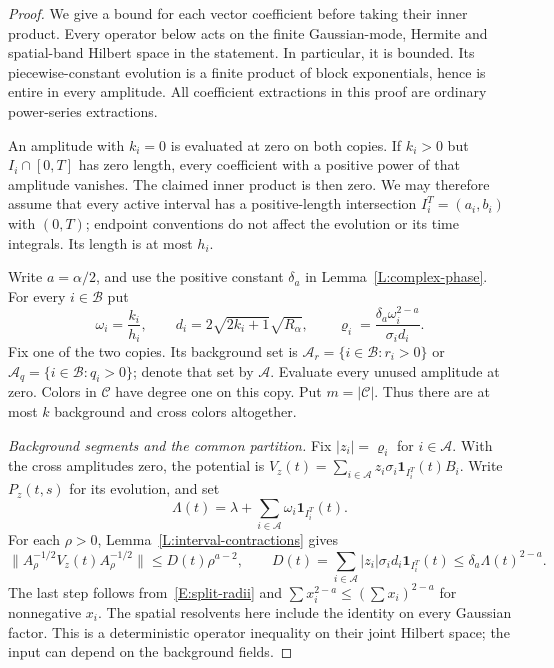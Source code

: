 \documentclass[12pt]{article}
\numberwithin{equation}{section}
\theoremstyle{definition}
\begin{document}
\begin{proof}
  We give a bound for each vector coefficient before taking their inner
  product. Every operator below acts on the finite Gaussian-mode, Hermite
  and spatial-band Hilbert space in the statement. In particular, it is
  bounded. Its piecewise-constant evolution is a finite product of block
  exponentials, hence is entire in every amplitude. All coefficient
  extractions in this proof are ordinary power-series extractions.

  An amplitude with $k_i=0$ is evaluated at zero on both copies. If
  $k_i>0$ but $I_i\cap[0,T]$ has zero length, every coefficient with a
  positive power of that amplitude vanishes. The claimed inner product
  is then zero. We may therefore assume that every active interval has
  a positive-length intersection
  $I_i^T=(a_i,b_i)$ with $(0,T)$; endpoint conventions do not affect the
  evolution or its time integrals. Its length is at most $h_i$.

  Write $a=\alpha/2$, and use the positive constant $\delta_a$ in
  Lemma~\ref{L:complex-phase}. For every $i\in\mathcal B$ put
  \begin{equation}\label{E:split-radii}
    \omega_i=\frac{k_i}{h_i},\qquad
    d_i=2\sqrt{2k_i+1}\sqrt{R_\alpha},\qquad
    \varrho_i=\frac{\delta_a\omega_i^{2-a}}{\sigma_i d_i}.
  \end{equation}
  Fix one of the two copies. Its background set is
  $\mathcal A_r=\{i\in\mathcal B:r_i>0\}$ or
  $\mathcal A_q=\{i\in\mathcal B:q_i>0\}$; denote that set by
  $\mathcal A$. Evaluate every unused amplitude at zero. Colors in
  $\mathcal C$ have degree one on this copy. Put $m=|\mathcal C|$.
  Thus there are at most $k$ background and cross colors altogether.

  \emph{Background segments and the common partition.}
  Fix $|z_i|=\varrho_i$ for $i\in\mathcal A$. With the cross amplitudes
  zero, the potential is
  $V_z(t)=\sum_{i\in\mathcal A}z_i\sigma_i\mathbf1_{I_i^T}(t)B_i$.
  Write $P_z(t,s)$ for its evolution, and set
  \[
    \Lambda(t)=\lambda+\sum_{i\in\mathcal A}
    \omega_i\mathbf1_{I_i^T}(t).
  \]
  For each $\rho>0$, Lemma~\ref{L:interval-contractions} gives
  \[
    \|A_\rho^{-1/2}V_z(t)A_\rho^{-1/2}\|
    \le D(t)\rho^{a-2},\qquad
    D(t)=\sum_{i\in\mathcal A}|z_i|\sigma_i d_i
    \mathbf1_{I_i^T}(t)
    \le\delta_a\Lambda(t)^{2-a}.
  \]
  The last step follows from~\eqref{E:split-radii} and
  $\sum x_i^{2-a}\le(\sum x_i)^{2-a}$ for nonnegative $x_i$.
  The spatial resolvents here include the identity on every Gaussian
  factor. This is a deterministic operator inequality on their joint
  Hilbert space; the input can depend on the background fields.


\end{proof}
\end{document}

